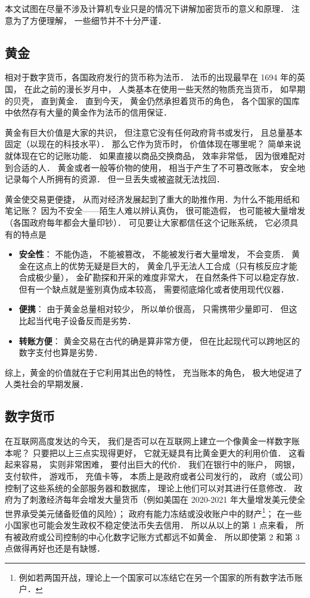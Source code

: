 
本文试图在尽量不涉及计算机专业只是的情况下讲解加密货币的意义和原理． 注意为了方便理解， 一些细节并不十分严谨．

\subsection{黄金}
相对于数字货币，各国政府发行的货币称为法币． 法币的出现最早在 1694 年的英国， 在此之前的漫长岁月中， 人类基本在使用一些天然的物质充当货币， 如早期的贝壳， 直到黄金． 直到今天， 黄金仍然承担着货币的角色， 各个国家的国库中依然存有大量的黄金作为法币的信用保证．

黄金有巨大价值是大家的共识， 但注意它没有任何政府背书或发行， 且总量基本固定（以现在的科技水平）． 那么它作为货币时， 价值体现在哪里呢？ 简单来说就体现在它的记账功能． 如果直接以商品交换商品， 效率非常低， 因为很难配对到合适的人． 黄金或者一般等价物的使用， 相当于产生了不可篡改账本， 安全地记录每个人所拥有的资源． 但一旦丢失或被盗就无法找回．

黄金使交易更便捷， 从而对经济发展起到了重大的助推作用．为什么不能用纸和笔记账？ 因为不安全——陌生人难以辨认真伪， 很可能造假， 也可能被大量增发（各国政府每年都会大量印钞）． 可见要让大家都信任这个记账系统， 它必须具有的特点是
\begin{itemize}
\item \textbf{安全性}： 不能伪造， 不能被篡改， 不能被发行者大量增发， 不会变质． 黄金在这点上的优势无疑是巨大的， 黄金几乎无法人工合成（只有核反应才能合成极少量）， 金矿勘探和开采的难度非常大， 在自然条件下可以稳定存放． 但有一个缺点就是鉴别真伪成本较高， 需要彻底熔化或者使用现代仪器．
\item \textbf{便携}： 由于黄金总量相对较少， 所以单价很高， 只需携带少量即可． 但这比起当代电子设备反而是劣势．
\item \textbf{转账方便}： 黄金交易在古代的确是算非常方便， 但在比起现代可以跨地区的数字支付也算是劣势．
\end{itemize}

综上，黄金的价值就在于它利用其出色的特性， 充当账本的角色， 极大地促进了人类社会的早期发展．

\subsection{数字货币}
在互联网高度发达的今天， 我们是否可以在互联网上建立一个像黄金一样数字账本呢？ 只要把以上三点实现得更好， 它就无疑具有比黄金更大的利用价值． 这看起来容易， 实则非常困难， 要付出巨大的代价． 我们在银行中的账户， 网银， 支付软件， 游戏币， 充值卡等， 本质上是政府或者公司发行的， 政府（或公司）控制了这些系统的全部服务器和数据库， 理论上他们可以对其进行任意修改． 政府为了刺激经济每年会增发大量货币（例如美国在 2020-2021 年大量增发美元使全世界承受美元储备贬值的风险）； 政府有能力冻结或没收账户中的财产\footnote{例如若两国开战，理论上一个国家可以冻结它在另一个国家的所有数字法币账户．}； 在一些小国家也可能会发生政权不稳定使法币失去信用． 所以从以上的第 1 点来看， 所有被政府或公司控制的中心化数字记账方式都远不如黄金． 所以即使第 2 和第 3 点做得再好也还是有缺憾．

